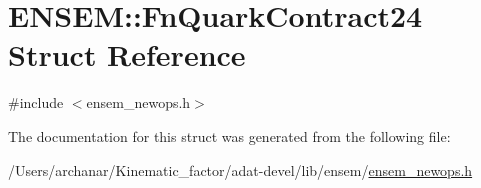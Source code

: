 \hypertarget{structENSEM_1_1FnQuarkContract24}{}\section{E\+N\+S\+EM\+:\+:Fn\+Quark\+Contract24 Struct Reference}
\label{structENSEM_1_1FnQuarkContract24}


{\ttfamily \#include $<$ensem\+\_\+newops.\+h$>$}



The documentation for this struct was generated from the following file\+:\begin{DoxyCompactItemize}
\item 
/\+Users/archanar/\+Kinematic\+\_\+factor/adat-\/devel/lib/ensem/\mbox{\hyperlink{adat-devel_2lib_2ensem_2ensem__newops_8h}{ensem\+\_\+newops.\+h}}\end{DoxyCompactItemize}

